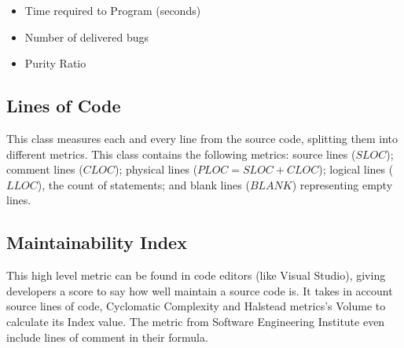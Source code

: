 \begin{itemize}
  \item Time required to Program (seconds) 
  \item Number of delivered bugs 
  \item Purity Ratio 
\end{itemize}

\subsection{Lines of Code}

This class measures each and every line from the source code, splitting them into different metrics.
This class contains the following metrics: source lines ($SLOC$); comment lines ($CLOC$); physical lines ($PLOC = SLOC + CLOC$);
logical lines ($LLOC$), the count of statements; and blank lines ($BLANK$) representing empty lines.

\subsection{Maintainability Index}

This high level metric can be found in code editors (like Visual Studio), giving developers a score to say how well maintain
a source code is. It takes in account source lines of code, Cyclomatic Complexity and Halstead metrics's Volume to calculate its Index value.
The metric from Software Engineering Institute even include lines of comment in their formula.


